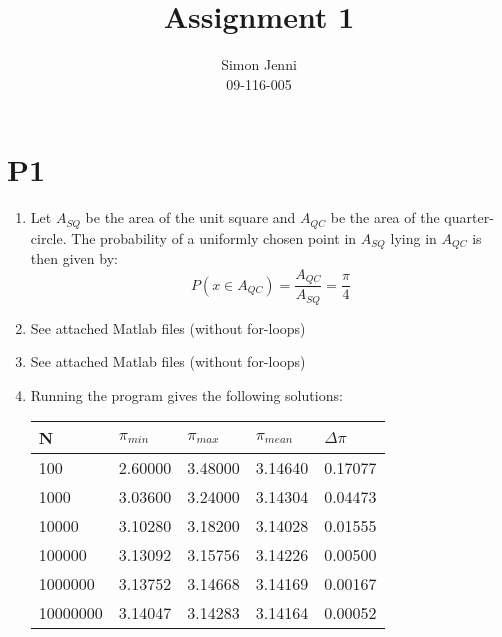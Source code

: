 \documentclass{paper}
\title{Assignment 1}
\author{Simon Jenni\\09-116-005}
\begin{document}
\maketitle


%

\section*{P1}

\begin{enumerate}
\item  
Let $A_{SQ}$ be the area of the unit square and $A_{QC}$ be the area of the quarter-circle. The probability of a uniformly chosen point in $A_{SQ}$ lying in $A_{QC}$ is then given by:
\begin{equation}
P(x\in A_{QC}) = \frac{A_{QC}}{A_{SQ}} = \frac{\pi}{4}
\end{equation}

\item 
See attached Matlab files (without for-loops)
\item
See attached Matlab files (without for-loops)

\item
Running the program gives the following solutions:

\begin{table}[!htbp]
\centering
\begin{tabular}{|l|l|l|l|l|}
\hline
N        & $\pi_{min}$ & $\pi_{max}$ & $\pi_{mean}$ & $\Delta \pi$ \\ \hline
100      & 2.60000     & 3.48000     & 3.14640      & 0.17077      \\ \hline
1000     & 3.03600     & 3.24000     & 3.14304      & 0.04473      \\ \hline
10000    & 3.10280     & 3.18200     & 3.14028      & 0.01555      \\ \hline
100000   & 3.13092     & 3.15756     & 3.14226      & 0.00500      \\ \hline
1000000  & 3.13752     & 3.14668     & 3.14169      & 0.00167      \\ \hline
10000000 & 3.14047     & 3.14283     & 3.14164      & 0.00052      \\ \hline
\end{tabular}
\end{table}
\end{enumerate}
\end{document}
